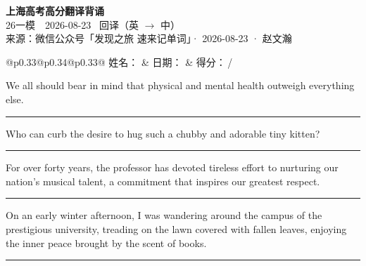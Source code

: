 \documentclass[11pt,a4paper]{article}
\newcommand{\num}[1]{\makebox[1.9em][r]{#1.}\hspace{0.3em}}
\newcommand{\wline}{\noindent\rule{\linewidth}{0.4pt}}
\begin{document}
\pagestyle{plain}
\begin{center}
{\LARGE\bfseries 上海高考高分翻译背诵 }\\[0.25em]
{\large 26一模　2026-08-23 \quad\ 回译（英 $\to$ 中）}\\[0.35em]
{\footnotesize 来源：微信公众号「发现之旅 速来记单词」· 2026-08-23 · 赵文瀚}
\end{center}

\vspace{0.4em}
\noindent\begin{tabular}{@{}p{0.33\textwidth}@{}p{0.34\textwidth}@{}p{0.33\textwidth}@{}}
姓名：\underline{\hspace{2.0cm}} & 日期：\underline{\hspace{2.0cm}} & 得分：\underline{\hspace{1.4cm}}\,/ \\
\end{tabular}

\vspace{0.5em}

\vspace{0.8em}
\num{1}We all should bear in mind that physical and mental health outweigh everything else.

\vspace{0.25em}

\wline

\num{2}Who can curb the desire to hug such a chubby and adorable tiny kitten?

\vspace{0.25em}

\wline

\num{3}For over forty years, the professor has devoted tireless effort to nurturing our nation’s musical talent, a commitment that inspires our greatest respect.

\vspace{0.25em}

\wline

\num{4}On an early winter afternoon, I was wandering around the campus of the prestigious university, treading on the lawn covered with fallen leaves, enjoying the inner peace brought by the scent of books.

\vspace{0.25em}

\wline
\end{document}
